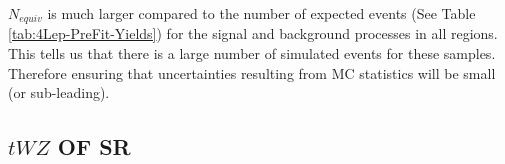 \begin{table}[h!]	
\centering
\caption{The number of equivalent events, $N_{equiv}$, is shown for each sample in each region.}
\label{tab:N-equiv}
\end{table}$N_{equiv}$ is much larger compared to the number of expected events (See Table \ref{tab:4Lep-PreFit-Yields}) for the signal and background processes in all regions. This tells us that there is a large number of simulated events for these samples. Therefore ensuring that uncertainties resulting from MC statistics will be small (or sub-leading).

\subsection{$tWZ$ OF SR}
\label{sec:controlplotstetralepton-tWZ-OF-SR}



